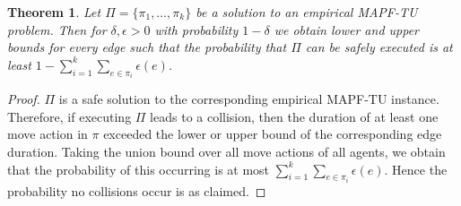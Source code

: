 \documentclass[jair,twoside,11pt,theapa]{article}
\newcommand{\mapftu}{MAPF-TU\xspace}
\newtheorem{theorem}{Theorem}
\begin{document}

\begin{theorem}
Let $\Pi=\{\pi_1,\ldots,\pi_k\}$ be a solution to an empirical \mapftu problem. 
Then for $\delta, \epsilon>0$ with probability $1-\delta$ we obtain lower and upper bounds for every edge such that the probability that $\Pi$ can be safely executed is at least 
$1-\sum_{i=1}^k\sum_{e\in \pi_i} \epsilon(e)$. 
\label{the:solution-safe-prob}
\end{theorem}
\begin{proof}
$\Pi$ is a safe solution to the corresponding empirical \mapftu instance. 
Therefore, if executing $\Pi$ leads to a collision, then the duration of at least one move action in $\pi$ exceeded the lower or upper bound of the corresponding edge duration. Taking the union bound over all move actions of all agents, we obtain that the probability of this occurring is at most $\sum_{i=1}^k\sum_{e\in \pi_i} \epsilon(e)$. Hence the probability no collisions occur is as claimed.
\end{proof}
\end{document}

